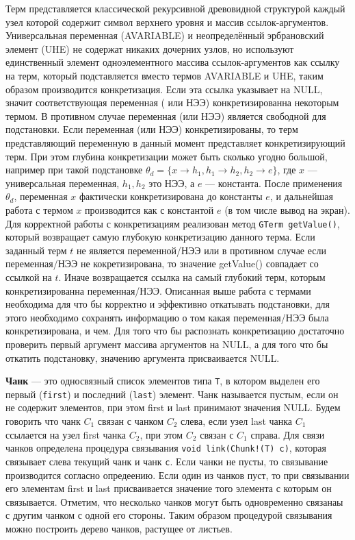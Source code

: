 Терм представляется классической рекурсивной древовидной структурой каждый узел которой содержит символ  верхнего уровня и массив ссылок-аргументов. Универсальная переменная (AVARIABLE) и неопределённый эрбрановский элемент (UHE) не содержат никаких дочерних узлов, но используют единственный элемент одноэлементного массива ссылок-аргументов как ссылку на терм, который подставляется вместо термов AVARIABLE и UHE, таким образом производится конкретизация. Если эта ссылка указывает на NULL, значит соответствующая переменная ( или НЭЭ) конкретизированна некоторым термом. В противном случае переменная (или НЭЭ) является свободной для подстановки. Если переменная (или НЭЭ) конкретизированы, то терм представляющий переменную в данный момент представляет конкретизирующий терм. При этом глубина конкретизации может быть сколько угодно большой, например при такой подстановке ${\theta}_d = \{x \rightarrow h_1, h_1 \rightarrow h_2, h_2 \rightarrow e \}$, где $x$ --- универсальная переменная, $h_1, h_2$ это НЭЭ, а $e$ --- константа. После применения ${\theta}_d$, переменная $x$ фактически конкретизирована до константы $e$, и дальнейшая работа с термом $x$ производится как с константой $e$ (в том числе вывод на экран). Для корректной работы с конкретизациям реализован метод {\tt GTerm getValue()}, который возвращает самую глубокую конкретизацию данного терма. Если заданный терм $t$ не является переменной/НЭЭ или в противном случае если переменная/НЭЭ не кокретизирована, то значение getValue() совпадает со ссылкой на $t$. Иначе возвращается ссылка на самый глубокий терм, которым конкретизированна переменная/НЭЭ. Описанная выше работа с термами необходима для что бы корректно и эффективно откатывать подстановки, для этого необходимо сохранять информацию о том какая переменная/НЭЭ была конкретизирована, и чем. Для того что бы распознать конкретизацию достаточно проверить первый аргумент массива аргументов на NULL, а для того что бы откатить подстановку, значению аргумента присваивается NULL. 

\textbf{Чанк} --- это односвязный список элементов типа {\tt T}, в котором выделен его первый ({\tt first}) и последний ({\tt last}) элемент. Чанк называется пустым, если он не содержит элементов, при этом first и last принимают значения NULL. Будем говорить что чанк $C_1$ связан с чанком $C_2$ слева, если узел last чанка $C_1$ ссылается на узел first чанка $C_2$, при этом $C_2$ связан с $C_1$ справа. Для связи чанков определена процедура связывания {\tt void link(Chunk!(T) c)}, которая связывает слева текущий чанк и чанк {\tt c}. Если чанки не пусты, то связывание производится согласно опредеению. Если один из чанков пуст, то при связывании его элементам first и last присваивается значение того элемента с которым он связывается. Отметим, что несколько чанков могут быть одновременно связанаы с другим чанком с одной его стороны. Таким образом процедурой связывания можно построить дерево чанков, растущее от листьев.


